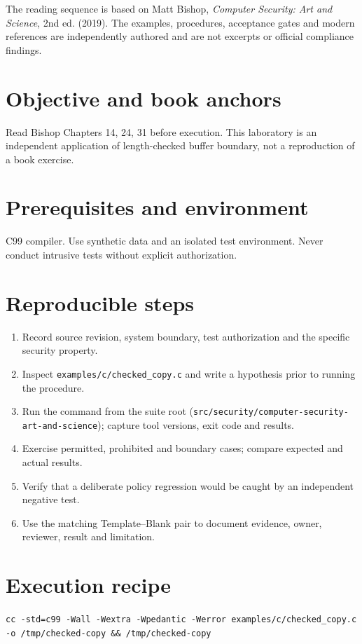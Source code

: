 \documentclass[10pt,letterpaper]{article}
\begin{document}
\makedoctocpage
\begin{notebox}
The reading sequence is based on Matt Bishop, \emph{Computer Security: Art and Science}, 2nd ed. (2019). The examples, procedures, acceptance gates and modern references are independently authored and are not excerpts or official compliance findings.
\end{notebox}
\section{Objective and book anchors}
Read Bishop Chapters 14, 24, 31 before execution. This laboratory is an independent application of length-checked buffer boundary, not a reproduction of a book exercise.
\section{Prerequisites and environment}
C99 compiler. Use synthetic data and an isolated test environment. Never conduct intrusive tests without explicit authorization.
\section{Reproducible steps}
\begin{enumerate}
\item Record source revision, system boundary, test authorization and the specific security property.
\item Inspect \texttt{examples/c/checked\_copy.c} and write a hypothesis prior to running the procedure.
\item Run the command from the suite root (\texttt{src/security/computer-security-art-and-science}); capture tool versions, exit code and results.
\item Exercise permitted, prohibited and boundary cases; compare expected and actual results.
\item Verify that a deliberate policy regression would be caught by an independent negative test.
\item Use the matching Template--Blank pair to document evidence, owner, reviewer, result and limitation.
\end{enumerate}
\section{Execution recipe}
\begin{viewbox}\raggedright\small\texttt{cc -std=c99 -Wall -Wextra -Wpedantic -Werror examples/c/checked\_copy.c -o /tmp/checked-copy \&\& /tmp/checked-copy}\end{viewbox}
\end{document}
